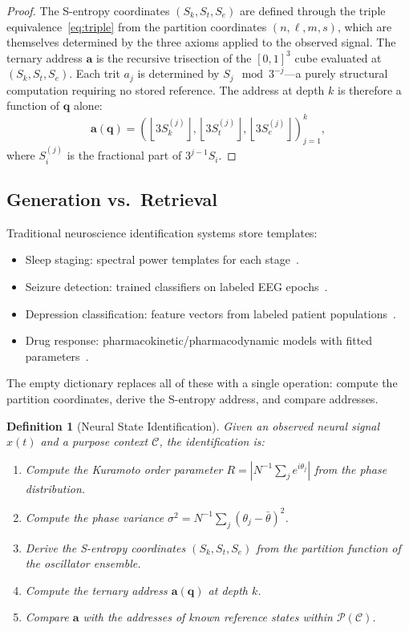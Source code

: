 \documentclass[aps,prd,twocolumn,superscriptaddress,floatfix,nofootinbib]{revtex4-2}
\newtheorem{definition}[theorem]{Definition}
\theoremstyle{remark}
\newcommand{\Sk}{S_k}
\newcommand{\St}{S_t}
\newcommand{\Se}{S_e}
\newcommand{\qvec}{\mathbf{q}}
\newcommand{\Purpose}{\mathcal{P}}
\newcommand{\Context}{\mathcal{C}}
\begin{document}
\begin{proof}
The S-entropy coordinates $(\Sk, \St, \Se)$ are defined through the triple equivalence~\eqref{eq:triple} from the partition coordinates $(n, \ell, m, s)$, which are themselves determined by the three axioms applied to the observed signal.
The ternary address $\mathbf{a}$ is the recursive trisection of the $[0,1]^3$ cube evaluated at $(\Sk, \St, \Se)$.
Each trit $a_j$ is determined by $S_j \mod 3^{-j}$---a purely structural computation requiring no stored reference.
The address at depth $k$ is therefore a function of $\qvec$ alone:
\[
\mathbf{a}(\qvec) = \left(\left\lfloor 3 \Sk^{(j)}\right\rfloor, \left\lfloor 3 \St^{(j)}\right\rfloor, \left\lfloor 3 \Se^{(j)}\right\rfloor\right)_{j=1}^{k},
\]
where $S_i^{(j)}$ is the fractional part of $3^{j-1} S_i$.
\end{proof}

\subsection{Generation vs.\ Retrieval}

Traditional neuroscience identification systems store templates:
\begin{itemize}[noitemsep]
    \item Sleep staging: spectral power templates for each stage~\cite{berry2017aasm}.
    \item Seizure detection: trained classifiers on labeled EEG epochs~\cite{shoeb2010application,gotman1982automatic}.
    \item Depression classification: feature vectors from labeled patient populations~\cite{mumtaz2017review,fingelkurts2015altered}.
    \item Drug response: pharmacokinetic/pharmacodynamic models with fitted parameters~\cite{bonate2011pharmacokinetic}.
\end{itemize}

The empty dictionary replaces all of these with a single operation: compute the partition coordinates, derive the S-entropy address, and compare addresses.

\begin{definition}[Neural State Identification]
\label{def:identification}
Given an observed neural signal $x(t)$ and a purpose context $\Context$, the identification is:
\begin{enumerate}[noitemsep]
    \item Compute the Kuramoto order parameter $R = |N^{-1}\sum_j e^{i\theta_j}|$ from the phase distribution.
    \item Compute the phase variance $\sigma^2 = N^{-1}\sum_j(\theta_j - \bar{\theta})^2$.
    \item Derive the S-entropy coordinates $(\Sk, \St, \Se)$ from the partition function of the oscillator ensemble.
    \item Compute the ternary address $\mathbf{a}(\qvec)$ at depth $k$.
    \item Compare $\mathbf{a}$ with the addresses of known reference states within $\Purpose(\Context)$.
\end{enumerate}
\end{definition}
\end{document}
